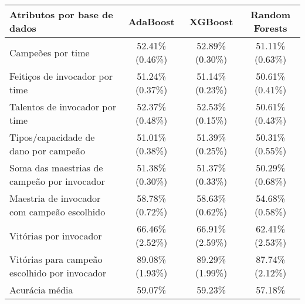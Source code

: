 \documentclass{standalone}
\begin{document}
\begin{tabular}{lccc} %
\toprule
Atributos por base de dados & AdaBoost & XGBoost & Random Forests\\
\midrule
\rowcolor{black!20} Campeões por time & 52.41\% (0.46\%) & 52.89\% (0.30\%) & 51.11\% (0.63\%)\\
Feitiços de invocador por time & 51.24\% (0.37\%) & 51.14\% (0.23\%) & 50.61\% (0.41\%)\\
\rowcolor{black!20} Talentos de invocador por time & 52.37\% (0.48\%) & 52.53\% (0.15\%) & 50.61\% (0.43\%)\\
Tipos/capacidade de dano por campeão & 51.01\% (0.38\%) & 51.39\% (0.25\%) & 50.31\% (0.55\%)\\
\rowcolor{black!20} Soma das maestrias de campeão por invocador & 51.38\% (0.30\%) & 51.37\% (0.33\%) & 50.29\% (0.68\%)\\
Maestria de invocador com campeão escolhido& 58.78\% (0.72\%) & 58.63\% (0.62\%) & 54.68\% (0.58\%)\\
\rowcolor{black!20} Vitórias por invocador & 66.46\% (2.52\%) & 66.91\% (2.59\%) & 62.41\% (2.53\%)\\
Vitórias para campeão escolhido por invocador& 89.08\% (1.93\%) & 89.29\% (1.99\%) & 87.74\% (2.12\%)\\
\midrule[\heavyrulewidth]
\rowcolor{black!20} Acurácia média & 59.07\% & 59.23\% & 57.18\% \\
\midrule
\end{tabular}
\end{document}
